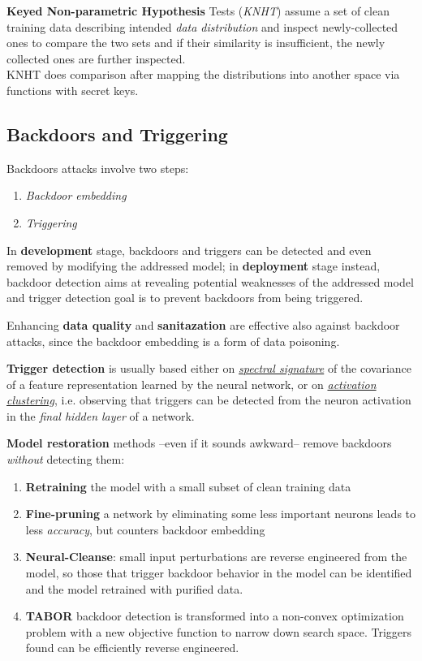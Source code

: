 \textbf{Keyed Non-parametric Hypothesis} Tests (\textit{KNHT}) assume a set of clean training data describing intended \textit{data distribution} and
inspect newly-collected ones to compare the two sets and if their similarity
is insufficient, the newly collected ones are further inspected.\\
KNHT does comparison after mapping the distributions into another space
via functions with secret keys.

\subsection{Backdoors and Triggering}
Backdoors attacks involve two steps:
\begin{enumerate}
   \item \textit{Backdoor embedding}
   \item \textit{Triggering}
\end{enumerate}

In \textbf{development} stage, backdoors and triggers can be detected and
even removed by modifying the addressed model;
in \textbf{deployment} stage instead, backdoor detection aims at revealing potential
weaknesses of the addressed model and trigger detection goal is to
prevent backdoors from being triggered.

Enhancing \textbf{data quality} and \textbf{sanitazation} are effective also against backdoor attacks,
since the backdoor embedding is a form of data poisoning.

\textbf{Trigger detection} is usually based either on \textit{\underline{spectral signature}} of the covariance of a feature representation learned by the neural network,
or on \textit{\underline{activation clustering}}, i.e. observing that triggers can be detected from the neuron
activation in the \textit{final hidden layer} of a network.

\textbf{Model restoration} methods {--}even if it sounds awkward{--} remove backdoors \textit{without} detecting them:
\begin{enumerate}
   \item \textbf{Retraining} the model with a small subset of clean training data
   \item \textbf{Fine-pruning} a network by eliminating some less important neurons leads to less \textit{accuracy}, but counters backdoor embedding
   \item \textbf{Neural-Cleanse}: 
   small input perturbations are reverse engineered from the
   model, so those that trigger backdoor behavior in the model can be identified and the model retrained with purified data.
   \item \textbf{TABOR} backdoor detection is transformed into a non-convex optimization
   problem with a new objective function to narrow down search space.
   Triggers found can be efficiently reverse engineered.
\end{enumerate}

